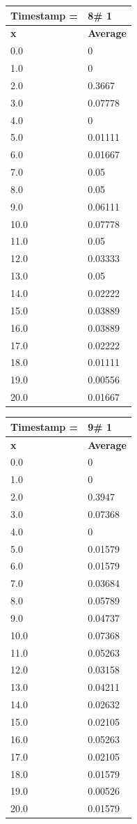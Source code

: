 \begin{tabular}{|l||l|}
\hline
\textbf{Timestamp =} & \textbf{8}\# 1\\\hline
	\textbf{x} & \textbf{Average} \\ \hline
\hline
	0.0 & 0 \\ \hline
	1.0 & 0 \\ \hline
	2.0 & 0.3667 \\ \hline
	3.0 & 0.07778 \\ \hline
	4.0 & 0 \\ \hline
	5.0 & 0.01111 \\ \hline
	6.0 & 0.01667 \\ \hline
	7.0 & 0.05 \\ \hline
	8.0 & 0.05 \\ \hline
	9.0 & 0.06111 \\ \hline
	10.0 & 0.07778 \\ \hline
	11.0 & 0.05 \\ \hline
	12.0 & 0.03333 \\ \hline
	13.0 & 0.05 \\ \hline
	14.0 & 0.02222 \\ \hline
	15.0 & 0.03889 \\ \hline
	16.0 & 0.03889 \\ \hline
	17.0 & 0.02222 \\ \hline
	18.0 & 0.01111 \\ \hline
	19.0 & 0.00556 \\ \hline
	20.0 & 0.01667 \\ \hline
\end{tabular}
\begin{tabular}{|l||l|}
\hline
\textbf{Timestamp =} & \textbf{9}\# 1\\\hline
	\textbf{x} & \textbf{Average} \\ \hline
\hline
	0.0 & 0 \\ \hline
	1.0 & 0 \\ \hline
	2.0 & 0.3947 \\ \hline
	3.0 & 0.07368 \\ \hline
	4.0 & 0 \\ \hline
	5.0 & 0.01579 \\ \hline
	6.0 & 0.01579 \\ \hline
	7.0 & 0.03684 \\ \hline
	8.0 & 0.05789 \\ \hline
	9.0 & 0.04737 \\ \hline
	10.0 & 0.07368 \\ \hline
	11.0 & 0.05263 \\ \hline
	12.0 & 0.03158 \\ \hline
	13.0 & 0.04211 \\ \hline
	14.0 & 0.02632 \\ \hline
	15.0 & 0.02105 \\ \hline
	16.0 & 0.05263 \\ \hline
	17.0 & 0.02105 \\ \hline
	18.0 & 0.01579 \\ \hline
	19.0 & 0.00526 \\ \hline
	20.0 & 0.01579 \\ \hline
\end{tabular}


